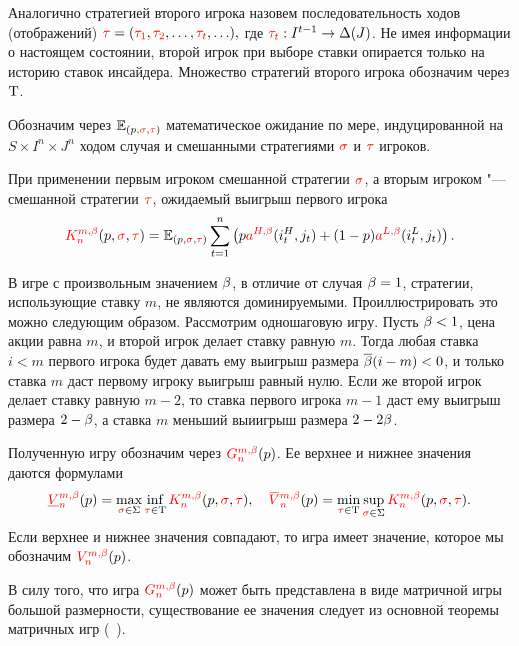 {Аналогично стратегией второго игрока назовем последовательность ходов (отображений) 
$\textcolor{red}{\tau} = (\textcolor{red}{\tau_{1}}, \textcolor{red}{\tau_{2}}, \ldots, \textcolor{red}{\tau_{t}}, \ldots),$ где 
$\textcolor{red}{\tau_{t}}: I^{t-1} \rightarrow \Delta(J)$.
Не имея информации о настоящем состоянии, второй игрок при выборе ставки опирается только на историю ставок инсайдера.
Множество стратегий второго игрока обозначим через $\mathrm{T}$.

Обозначим через $\operatorname{\mathbb{E}}_{(p,\textcolor{red}{\sigma},\textcolor{red}{\tau})}$ математическое ожидание по мере, индуцированной на $S \times I^n \times J^n$ ходом случая и смешанными стратегиями $\textcolor{red}{\sigma}$ и $\textcolor{red}{\tau}$ игроков.

При применении первым игроком смешанной стратегии $\textcolor{red}{\sigma}$, а вторым игроком "--- смешанной стратегии $\textcolor{red}{\tau}$, ожидаемый выигрыш первого игрока
\begin{equation}
  \label{ch1:eq:firstPlayerPayoff}
  \K*{n}(p, \sigmar, \taur) = \E_{(p,\sigmar,\taur)} \sum_{t=1}^n
  \left(
    p \as[H](i_t^H, j_t) + (1 - p)\as[L](i_t^L, j_t)
  \right).
\end{equation}

\begin{remark}
  В игре с произвольным значением $\beta$, в отличие от случая $\beta = 1$, стратегии, использующие ставку $m$, не являются доминируемыми.
  Проиллюстрировать это можно следующим образом.
  Рассмотрим одношаговую игру.
  Пусть $\beta < 1$, цена акции равна $m$, и второй игрок делает ставку равную $m$.
  Тогда любая ставка $i < m$ первого игрока будет давать ему выигрыш размера ${{\overline{\beta}}} (i - m) < 0$, и только ставка $m$ даст первому игроку выигрыш равный нулю. 
  Если же второй игрок делает ставку равную $m-2$, то ставка первого игрока $m-1$ даст ему выигрыш размера $2-\beta$, а ставка $m$ меньший выиигрыш размера $2-2\beta$.
\end{remark}

Полученную игру обозначим через $\theG*{n}(p)$. Ее верхнее и нижнее значения даются формулами
\begin{equation*}
  \LowV*{n}(p) = \max_{\sigmar \in \Sigma} \inf_{\taur \in \Tau}
  \K*{n}(p, \sigmar, \taur), \quad
  \HighV*{n}(p) = \min_{\taur \in \Tau} \sup_{\sigmar \in \Sigma}
  \K*{n}(p, \sigmar, \taur).
\end{equation*}
Если верхнее и нижнее значения совпадают, то игра имеет значение, которое мы обозначим $\V*{n}(p)$.

\begin{remark}
  В силу того, что игра $\theG*{n}(p)$ может быть представлена в виде матричной игры большой размерности, существование ее значения следует из основной теоремы матричных игр (\seename~\cite{morozov08}).
\end{remark}

}
